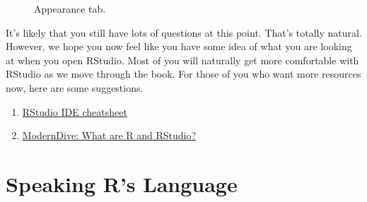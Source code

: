 \documentclass[
  letterpaper,
  DIV=11,
  numbers=noendperiod]{scrreprt}
\begin{document}
\begin{figure}


\caption{\label{fig-preferences4}Appearance tab.}

\end{figure}%

It's likely that you still have lots of questions at this point. That's
totally natural. However, we hope you now feel like you have some idea
of what you are looking at when you open RStudio. Most of you will
naturally get more comfortable with RStudio as we move through the book.
For those of you who want more resources now, here are some suggestions.

\begin{enumerate}
\def\labelenumi{\arabic{enumi}.}
\item
  \href{https://rstudio.com/resources/cheatsheets/}{RStudio IDE
  cheatsheet}
\item
  \href{https://moderndive.com/1-getting-started.html\#r-rstudio}{ModernDive:
  What are R and RStudio?}
\end{enumerate}

\chapter{Speaking R's Language}\label{speaking-rs-language}
\end{document}
